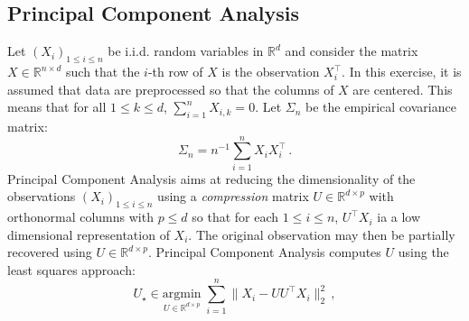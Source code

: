 \documentclass[a4paper,10pt,fleqn]{article}
\newcommand{\eqsp}{\,}
\newcommand{\rset}{\ensuremath{\mathbb{R}}}
\newcommand{\1}{\ensuremath{\mathbbm{1}}}
\newcommand{\bfU}{U}
\newcommand{\bfX}{X}
\newcommand{\bfs}{\Sigma}
\begin{document}
\subsection*{Principal Component Analysis}
 Let $(X_i)_{1\leqslant i\leqslant n}$ be i.i.d. random variables in $\rset^d$ and consider the matrix $\bfX\in\rset^{n\times d}$ such that the $i$-th row of $\bfX$ is the observation $X^\top_i$. In this exercise, it is assumed that data are preprocessed so that the columns of $\bfX$ are centered.  This means that for all $1\leqslant k \leqslant d$, $\sum_{i=1}^{n}X_{i,k} = 0$. Let $\bfs_n$ be the empirical covariance matrix:
$$
\bfs_n = n^{-1}\sum_{i=1}^n X_i X^\top_i\eqsp.
$$
Principal Component Analysis  aims at reducing the dimensionality of the observations $(X_i)_{1\leqslant i \leqslant n}$ using a {\em compression} matrix $\bfU\in \rset^{d\times p}$ with orthonormal columns with $p\leqslant d$ so that for each $1\leqslant i \leqslant n$, $\bfU^\top X_i$ ia a low dimensional representation of $X_i$. The original observation may then be partially recovered using  $\bfU\in \rset^{d\times p}$. Principal Component Analysis computes $\bfU$ using the least squares approach:
$$
\bfU_{\star} \in \underset{U\in  \rset^{d\times p}}{\mathrm{argmin}} \;\sum_{i=1}^n\|X_i - \bfU\bfU^\top X_i\|_2^2\eqsp,
$$
\end{document}
